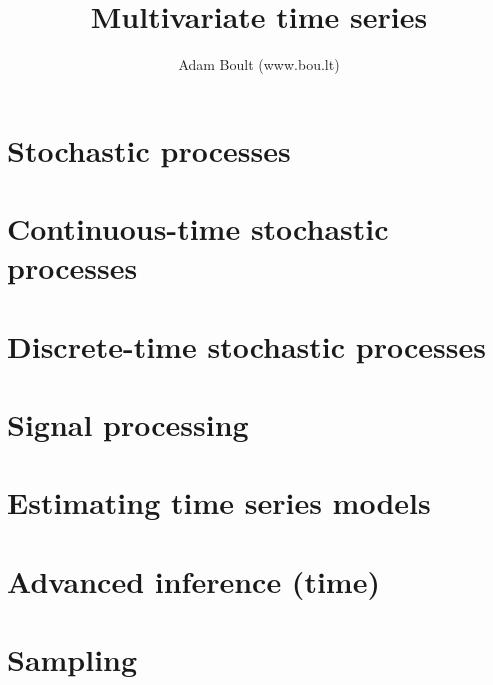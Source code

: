 \documentclass[oneside]{book}
\begin{document}
\author{Adam Boult (www.bou.lt)}
\title{Multivariate time series}
\maketitle

\setcounter{tocdepth}{0}
\tableofcontents



\part{Stochastic processes}









\part{Continuous-time stochastic processes}



\part{Discrete-time stochastic processes}







\part{Signal processing}






\part{Estimating time series models}







\part{Advanced inference (time)}





\part{Sampling}



\end{document}
